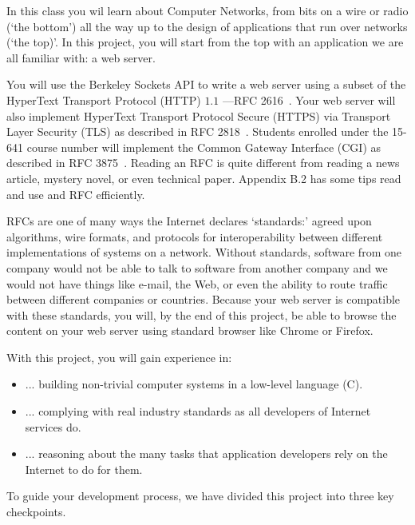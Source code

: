 In this class you wil learn about Computer Networks, from bits on a wire or radio (`the bottom') all the way up to the design of applications that run over networks (`the top)'. 
In this project, you will start from the top with an application we are all familiar with: a web server.

You will use the Berkeley Sockets API to write a web
server using a subset of the HyperText Transport Protocol (HTTP) $1.1$ ---RFC 2616~\cite{httprfc}.  Your web server will also implement
HyperText Transport Protocol Secure (HTTPS) via Transport Layer Security (TLS)
as described in RFC 2818~\cite{httpsrfc}.  Students enrolled under the 15-641 course number will
implement the Common Gateway Interface (CGI) as described in RFC
3875~\cite{cgirfc}.  Reading an RFC is quite different from reading a news article, mystery novel, or even  technical paper.
Appendix B.2 has some tips read and use and RFC efficiently.

RFCs are one of many ways the Internet declares `standards:' agreed upon algorithms, wire formats, and protocols for interoperability between different implementations of systems on a network.
Without standards, software from one company would not be able to talk to software from another company and we would not have things like e-mail, the Web, or even the ability to route traffic between different companies or countries.
Because your web server is compatible with these standards, you will, by the end of this project, be able to browse the content on your web server using standard browser like Chrome or Firefox.
 
\vspace{5pt}

\noindent With this project, you will gain experience in:
\begin{itemize}
  \item ... building non-trivial computer systems in a low-level language (C).
  \item ... complying with real industry standards as all developers of Internet services do.
  \item ... reasoning about the many tasks that application developers rely on the Internet to do for them.
\end{itemize}

\noindent To guide your development process, we have divided this project into three key checkpoints.

